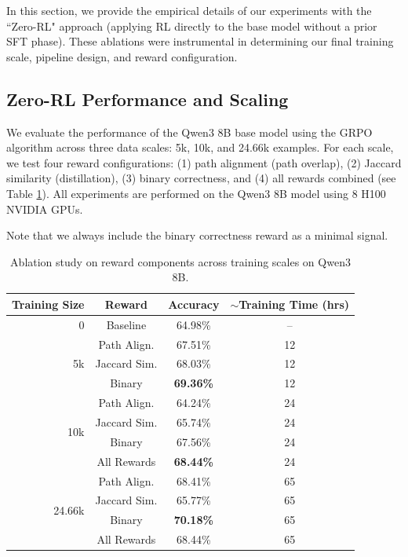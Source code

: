 \documentclass{article}
\theoremstyle{plain}
\theoremstyle{definition}
\theoremstyle{remark}
\begin{document}
In this section, we provide the empirical details of our experiments with the ``Zero-RL" approach (applying RL directly to the base model without a prior SFT phase). These ablations were instrumental in determining our final training scale, pipeline design, and reward configuration. 

\subsection{Zero-RL Performance and Scaling}
We evaluate the performance of the Qwen3 8B base model using the GRPO algorithm across three data scales: 5k, 10k, and 24.66k examples. For each scale, we test four reward configurations: (1) path alignment (path overlap), (2) Jaccard similarity (distillation), (3) binary correctness, and (4) all rewards combined (see Table \ref{tab:reward_ablation}). All experiments are performed on the Qwen3 8B model using 8 H100 NVIDIA GPUs.

Note that we always include the binary correctness reward as a minimal signal.

\begin{table}[ht]
\caption{Ablation study on reward components across training scales on Qwen3 8B.}
\label{tab:reward_ablation}
\vskip 0.15in
\begin{center}
\begin{small}
\begin{sc}
\begin{tabular}{rccc}
\toprule
Training Size & Reward & Accuracy & $\sim$Training Time (hrs) \\
\midrule
0 & Baseline & 64.98\% & -- \\
\midrule
\multirow{3}{*}{5k} 
  & Path Align. & 67.51\% & 12 \\
  & Jaccard Sim. & 68.03\% & 12 \\
  & Binary & \textbf{69.36\%} & 12 \\
\midrule
\multirow{4}{*}{10k} 
  & Path Align. & 64.24\% & 24 \\
  & Jaccard Sim. & 65.74\% & 24 \\
  & Binary & 67.56\% & 24 \\
  & All Rewards & \textbf{68.44\%} & 24 \\
\midrule
\multirow{4}{*}{24.66k} 
  & Path Align. & 68.41\% & 65 \\
  & Jaccard Sim. & 65.77\% & 65 \\
  & Binary & \textbf{70.18\%} & 65 \\
  & All Rewards & 68.44\% & 65 \\
\bottomrule
\end{tabular}
\end{sc}
\end{small}
\end{center}
\vskip -0.1in
\end{table}
\end{document}
